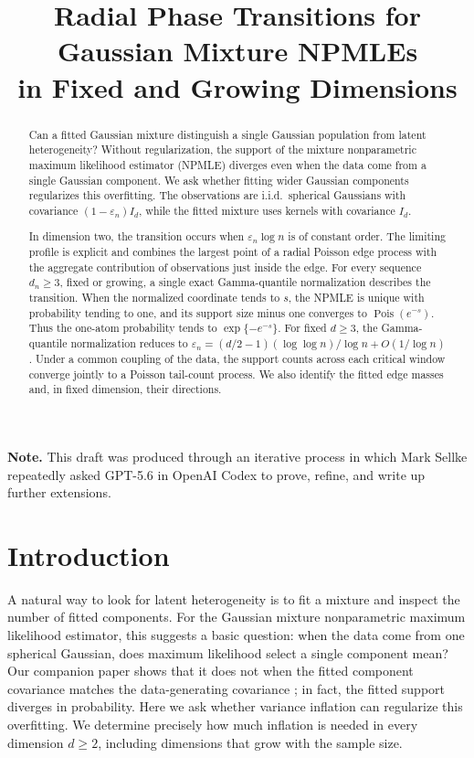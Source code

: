 \documentclass[11pt]{article}
\title{Radial Phase Transitions for Gaussian Mixture NPMLEs\\
in Fixed and Growing Dimensions}
\author{}
\date{}
\theoremstyle{remark}
\numberwithin{equation}{section}
\newcommand{\eps}{\varepsilon}
\begin{document}
\maketitle

\begin{abstract}
Can a fitted Gaussian mixture distinguish a single Gaussian population from
latent heterogeneity? Without regularization, the support of the mixture
nonparametric maximum likelihood estimator (NPMLE) diverges even when the data
come from a single Gaussian component. We ask whether fitting wider
Gaussian components regularizes this overfitting. The observations are
i.i.d.\ spherical Gaussians with covariance $(1-\eps_n)I_d$, while the fitted
mixture uses kernels with covariance $I_d$.

In dimension two, the transition occurs when $\eps_n\log n$ is of constant
order. The limiting profile is explicit and combines the largest point of a
radial Poisson edge process with the aggregate contribution of observations
just inside the edge. For every sequence $d_n\ge3$, fixed or growing, a single
exact Gamma-quantile normalization describes the transition. When the
normalized coordinate tends to \(s\), the NPMLE is unique with probability
tending to one, and its support size minus one converges to
\(\operatorname{Pois}(e^{-s})\). Thus the one-atom probability tends to
\(\exp\{-e^{-s}\}\). For fixed $d\ge3$, the Gamma-quantile normalization
reduces to
\(\eps_n=(d/2-1)(\log\log n)/\log n+O(1/\log n)\). Under a common coupling
of the data, the support counts across each critical window converge jointly
to a Poisson tail-count process. We also identify the fitted edge masses and,
in fixed dimension, their directions.
\end{abstract}

\medskip
\noindent\textbf{Note.} This draft was produced through an iterative process in which Mark Sellke repeatedly asked GPT-5.6 in OpenAI Codex to prove, refine, and write up further extensions.
\medskip

\setcounter{tocdepth}{2}
\tableofcontents

\section{Introduction}
\label{sec:introduction}

A natural way to look for latent heterogeneity is to fit a mixture and inspect
the number of fitted components. For the Gaussian mixture nonparametric
maximum likelihood estimator, this suggests a basic question: when the data
come from one spherical Gaussian, does maximum likelihood select a single
component mean? Our companion paper shows that it does not when the fitted
component covariance matches the data-generating covariance
\cite{supportDivergenceCompanion}; in fact, the fitted support diverges in
probability. Here we ask whether variance inflation can regularize this
overfitting. We determine precisely how much inflation is
needed in every dimension $d\ge2$, including dimensions that grow with the
sample size.
\end{document}
